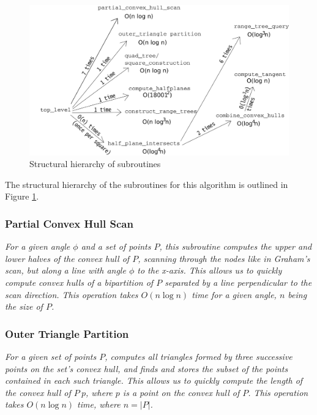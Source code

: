 \documentclass{article}
\newcommand{\figref}[1]{Figure \ref{#1}}
\begin{document}
\begin{figure}[ht]
    \centering
    \includegraphics[width=\textwidth]{hierarchy}
    \caption{Structural hierarchy of subroutines}
    \label{fig:hierarchy}
\end{figure}

The structural hierarchy of the subroutines for this algorithm is outlined in \figref{fig:hierarchy}.

\subsubsection{Partial Convex Hull Scan}

\textit{For a given angle $\phi$ and a set of points $P$, this subroutine computes the upper and lower halves of the convex hull of $P$, scanning through the nodes like in Graham's scan, but along a line with angle $\phi$ to the x-axis. This allows us to quickly compute convex hulls of a bipartition of $P$ separated by a line perpendicular to the scan direction. This operation takes $O(n \log n)$ time for a given angle, $n$ being the size of $P$.}

\subsubsection{Outer Triangle Partition}

\textit{For a given set of points $P$, computes all triangles formed by three successive points on the set's convex hull, and finds and stores the subset of the points contained in each such triangle. This allows us to quickly compute the length of the convex hull of $P \ {p}$, where $p$ is a point on the convex hull of $P$. This operation takes $O(n \log n)$ time, where $n = |P|$.}
    
\end{document}
